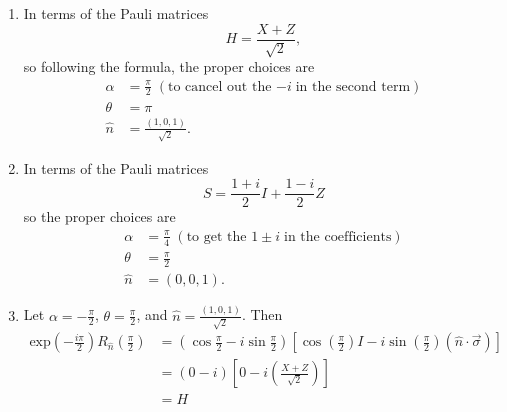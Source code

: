 \documentclass[a4paper,12pt]{article}
\begin{document}
\begin{enumerate}
\begin{enumerate}
            \item In terms of the Pauli matrices
                \[
                    H = \frac{X + Z}{\sqrt{2}},
                \]
                so following the formula, the proper choices are
                \begin{align*}
                    \alpha &= \frac{\pi}{2} \; (\mbox{to cancel out the } {-i} \; \mbox{in the second term}) \\
                    \theta &= \pi \\
                    \hat{n} &= \frac{(1, 0, 1)}{\sqrt{2}}.
                \end{align*}

            \item In terms of the Pauli matrices
                \[
                    S = \frac{1 + i}{2} I + \frac{1 - i}{2} Z
                \]
                so the proper choices are
                \begin{align*}
                    \alpha &= \frac{\pi}{4} \; (\mbox{to get the } 1 \pm i \; \mbox{in the coefficients}) \\
                    \theta &= \frac{\pi}{2} \\
                    \hat{n} &= (0, 0, 1).
                \end{align*}

            \iffalse
            \item Let $\alpha = -\frac{\pi}{2}$, $\theta = \frac{\pi}{2}$, and $\hat{n} = \frac{(1, 0, 1)}{\sqrt{2}}$. Then
                \begin{align*}
                    \mbox{exp} \left( -\frac{i\pi}{2} \right) R_{\hat{n}} \left( \frac{\pi}{2} \right) &= \left( \cos{\frac{\pi}{2}} - i\sin{\frac{\pi}{2}} \right) \left[ \cos{\left( \frac{\pi}{2} \right)} I - i\sin{\left( \frac{\pi}{2} \right)} (\hat{n} \cdot \vec{\sigma}) \right] \\
                    &= (0 - i)[0 - i \left( \frac{X + Z}{\sqrt{2}} \right)] \\
                    &= H
                \end{align*}


\end{enumerate}
\end{enumerate}
\end{document}
